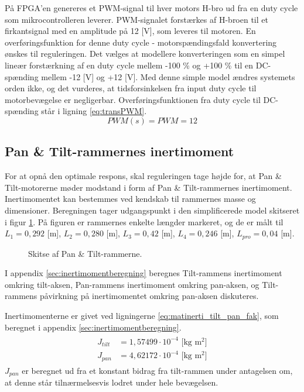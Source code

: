 På FPGA'en genereres et PWM-signal til hver motors H-bro ud fra en
duty cycle som mikrocontrolleren leverer.
PWM-signalet forstærkes af H-broen til et firkantsignal med en amplitude på 12 [V],
som leveres til motoren.
En overføringsfunktion for denne duty cycle - motorspændingsfald konvertering ønskes
til reguleringen.
Det vælges at modellere konverteringen som en simpel lineær forstærkning af en duty cycle mellem -100 \% og +100 \%
til en DC-spænding mellem -12 [V] og +12 [V]. Med denne simple model ændres systemets orden ikke,
og det vurderes, at tidsforsinkelsen fra input duty cycle til motorbevægelse er negligerbar.
Overføringsfunktionen fra duty cycle til DC-spænding står i ligning \ref{eq:transPWM}.
\begin{equation}
	PWM\left(s\right)=PWM=12
	\label{eq:transPWM}
\end{equation}

\subsection{Pan \& Tilt-rammernes inertimoment}
\label{sec:inertimoment}
For at opnå den optimale respons, skal reguleringen tage højde for, at Pan \& Tilt-motorerne møder modstand i form af
Pan \& Tilt-rammernes inertimoment. Inertimomentet kan bestemmes ved kendskab til rammernes
masse og dimensioner. Beregningen tager udgangspunkt i den simplificerede model skitseret i figur \ref{fig:inerti_PTS}.
På figuren er rammernes enkelte længder markeret, og de er målt til \({L_{1}} =0,292\) [m],
\({L_{2}} =0,280\) [m], \({L_{3}}= 0,42\) [m], \({L_{4}} =0,246\) [m], \({L_{pro}}=0,04\) [m].
\begin{figure}[!th]
\centering
\begin{tikzpicture}[scale=0.8]

\end{tikzpicture}
\caption[Skitse af Pan \& Tilt-rammerne]{Skitse af Pan \& Tilt-rammerne.}
\label{fig:inerti_PTS}
\end{figure}

I appendix \ref{sec:inertimomentberegning} beregnes Tilt-rammens inertimoment omkring tilt-aksen,
Pan-rammens inertimoment omkring pan-aksen,
og Tilt-rammens påvirkning på inertimomentet omkring pan-aksen diskuteres.

Inertimomenterne er givet ved ligningerne \ref{eq:matinerti_tilt_pan_fak},
som beregnet i appendix \ref{sec:inertimomentberegning}.
\begin{align}
\label{eq:matinerti_tilt_pan_fak}
\begin{split}
{J_{tilt}}&=1,57499\cdot{10}^{-4} \text{ [kg m$^2$]}
\\
{J_{pan}}&=4,62172\cdot{10}^{-4} \text{ [kg m$^2$]}
\end{split}
\end{align}
\(J_{pan}\) er beregnet ud fra et konstant bidrag fra tilt-rammen under antagelsen om,
at denne står tilnærmelsesvis lodret under hele bevægelsen.

